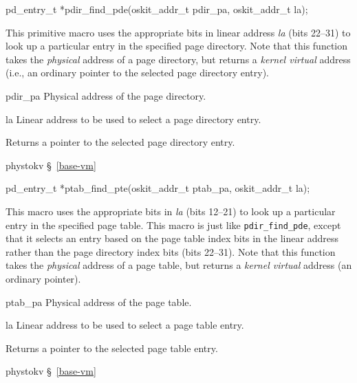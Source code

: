 \label{pdir-find-pde}
\begin{apisyn}

	\funcproto pd_entry_t *pdir_find_pde(oskit_addr_t pdir_pa,
					     oskit_addr_t la);
\end{apisyn}
\begin{apidesc}
	This primitive macro
	uses the appropriate bits in linear address \emph{la} (bits 22--31)
	to look up a particular entry in the specified page directory.
	Note that this function takes the \emph{physical} address
	of a page directory,
	but returns a \emph{kernel virtual} address
	(i.e., an ordinary pointer to the selected page directory entry).
\end{apidesc}
\begin{apiparm}
	\item[pdir_pa]
		Physical address of the page directory.
	\item[la]
		Linear address to be used to select a page directory entry.
\end{apiparm}
\begin{apiret}
	Returns a pointer to the selected page directory entry.
\end{apiret}
\begin{apidep}
	\item[phystokv]		\S~\ref{base-vm}
\end{apidep}

\label{ptab-find-pte}
\begin{apisyn}

	\funcproto pd_entry_t *ptab_find_pte(oskit_addr_t ptab_pa,
					     oskit_addr_t la);
\end{apisyn}
\begin{apidesc}
	This macro uses the appropriate bits in \emph{la} (bits 12--21)
	to look up a particular entry in the specified page table.
	This macro is just like {\tt pdir_find_pde},
	except that it selects an entry
	based on the page table index bits in the linear address
	rather than the page directory index bits (bits 22--31).
	Note that this function takes the \emph{physical} address
	of a page table,
	but returns a \emph{kernel virtual} address
	(an ordinary pointer).
\end{apidesc}
\begin{apiparm}
	\item[ptab_pa]
		Physical address of the page table.
	\item[la]
		Linear address to be used to select a page table entry.
\end{apiparm}
\begin{apiret}
	Returns a pointer to the selected page table entry.
\end{apiret}
\begin{apidep}
	\item[phystokv]		\S~\ref{base-vm}
\end{apidep}

